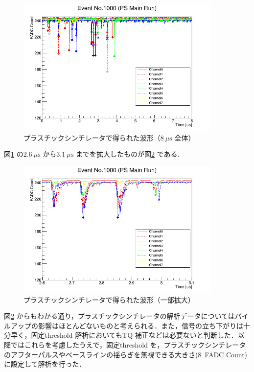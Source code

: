 \begin{figure}[h]
	\centering
	\includegraphics[width = 0.9\textwidth]{figure/odagawa/PSEventDisplayAll.png}
	\caption{プラスチックシンチレータで得られた波形（$8~\mu\mathrm{s}$ 全体）}
	\label{fig:PSEventDisplayAll}
\end{figure}%

図\ref{fig:PSEventDisplayAll} の$2.6~\mu\mathrm{s}$ から$3.1~\mu\mathrm{s}$ までを拡大したものが図\ref{fig:PSEventDisplayZoom} である.

\begin{figure}[h]
	\centering
	\includegraphics[width = 0.9\textwidth]{figure/odagawa/PSEventDisplayZoom.png}
	\caption{プラスチックシンチレータで得られた波形（一部拡大）}
	\label{fig:PSEventDisplayZoom}
\end{figure}%

図\ref{fig:PSEventDisplayZoom} からもわかる通り，プラスチックシンチレータの解析データについてはパイルアップの影響はほとんどないものと考えられる．また，信号の立ち下がりは十分早く，固定threshold 解析においてもTQ 補正などは必要ないと判断した．以降ではこれらを考慮したうえで，固定threshold を，プラスチックシンチレータのアフターパルスやベースラインの揺らぎを無視できる大きさ(8~FADC Count) に設定して解析を行った．

